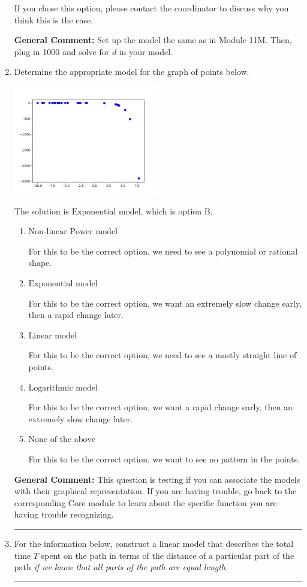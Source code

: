 \documentclass{extbook}[14pt]
\newcommand{\litem}[1]{\item #1

\rule{\textwidth}{0.4pt}}
\begin{document}
\begin{enumerate}
{\begin{enumerate}[label=\Alph*.]
If you chose this option, please contact the coordinator to discuss why you think this is the case.
\end{enumerate}

\textbf{General Comment:} Set up the model the same as in Module 11M. Then, plug in 1000 and solve for $d$ in your model.
}
\litem{
Determine the appropriate model for the graph of points below.

\begin{center}
    \includegraphics[width=0.5\textwidth]{../Figures/identifyModelGraph12CopyB.png}
\end{center}


The solution is \( \text{Exponential model} \), which is option B.\begin{enumerate}[label=\Alph*.]
\item \( \text{Non-linear Power model} \)

For this to be the correct option, we need to see a polynomial or rational shape.
\item \( \text{Exponential model} \)

For this to be the correct option, we want an extremely slow change early, then a rapid change later.
\item \( \text{Linear model} \)

For this to be the correct option, we need to see a mostly straight line of points.
\item \( \text{Logarithmic model} \)

For this to be the correct option, we want a rapid change early, then an extremely slow change later.
\item \( \text{None of the above} \)

For this to be the correct option, we want to see no pattern in the points.
\end{enumerate}

\textbf{General Comment:} This question is testing if you can associate the models with their graphical representation. If you are having trouble, go back to the corresponding Core module to learn about the specific function you are having trouble recognizing.
}
\litem{
For the information below, construct a linear model that describes the total time $T$ spent on the path in terms of the distance of a particular part of the path \textit{if we know that all parts of the path are equal length}.

}
\end{enumerate}
\end{document}
